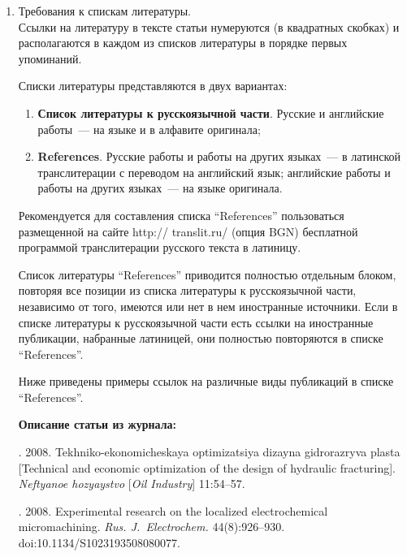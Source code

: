 {\begin{enumerate}[1.]

\item  Требования к спискам литературы.\\[-13.5pt]  

Ссылки на литературу в тексте статьи нумеруются (в квадратных скобках) и 
располагаются в каждом из списков литературы в порядке  первых упоминаний.

Списки литературы представляются в двух вариантах: 
\begin{enumerate}[(1)]
\item \textbf{Список литературы к русскоязычной части}. Русские и английские 
работы~---  на языке и в алфавите оригинала;\\[-13.5pt]  
\item  \textbf{References}. Русские работы и работы на других языках~--- в латинской 
транслитерации с переводом на английский язык; английские работы и работы на других 
языках~--- на языке оригинала. 
\end{enumerate}

Рекомендуется для составления списка ``References'' пользоваться размещенной на сайте 
{\sf http:// translit.ru/} (опция BGN) бесплатной программой транслитерации русского текста в 
латиницу. 

Список литературы ``References'' приводится полностью отдельным блоком, повторяя все 
позиции из списка литературы к русскоязычной части, независимо от того, имеются или 
нет в нем иностранные источники. Если в списке литературы к русскоязычной части есть 
ссылки на иностранные публикации, набранные латиницей, они полностью повторяются в 
списке ``References''.

Ниже приведены примеры ссылок на различные виды публикаций в списке ``References''. 

\thispagestyle{empty}

{\small

\noindent
\textbf{Описание статьи из журнала:}

. 2008. 
Tekhniko-ekonomicheskaya optimizatsiya dizayna gidrorazryva plasta [Technical and
economic optimization of the design 
of hydraulic fracturing]. \textit{Neftyanoe hozyaystvo} [\textit{Oil Industry}] 11:54--57.

. 2008. Experimental research on the localized 
electrochemical micromachining. \textit{Rus. J.~Electrochem.}  44(8):926--930. 
{\sf doi:10.1134/S1023193508080077}.

}
\end{enumerate}}
